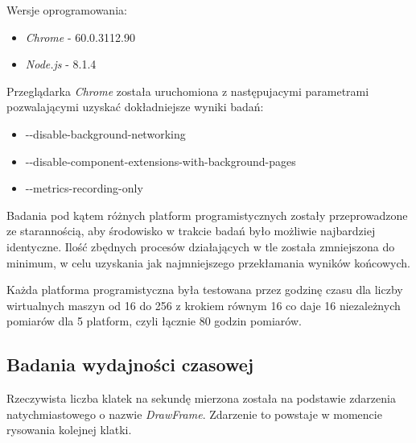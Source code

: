 \documentclass[polish, twoside, 12pt]{mwart}
\begin{document}
Wersje oprogramowania:

\begin{itemize}
  \item \emph{Chrome} - 60.0.3112.90
  \item \emph{Node.js} - 8.1.4
\end{itemize}

Przeglądarka \emph{Chrome} została uruchomiona z następujacymi parametrami pozwalającymi uzyskać dokładniejsze wyniki badań:

\begin{itemize}
  \item -{}-disable-background-networking
  \item -{}-disable-component-extensions-with-background-pages
  \item -{}-metrics-recording-only
\end{itemize}

Badania pod kątem różnych platform programistycznych zostały przeprowadzone ze starannością, aby środowisko w trakcie badań było możliwie najbardziej identyczne. Ilość zbędnych procesów działających w tle została zmniejszona do minimum, w celu uzyskania jak najmniejszego przekłamania wyników końcowych.

Każda platforma programistyczna była testowana przez godzinę czasu dla liczby wirtualnych maszyn od 16 do 256 z krokiem równym 16 co daje 16 niezależnych pomiarów dla 5 platform, czyli łącznie 80 godzin pomiarów.

\subsection{Badania wydajności czasowej}

Rzeczywista liczba klatek na sekundę mierzona została na podstawie zdarzenia natychmiastowego o nazwie \emph{DrawFrame}. Zdarzenie to powstaje w momencie rysowania kolejnej klatki.
\end{document}
